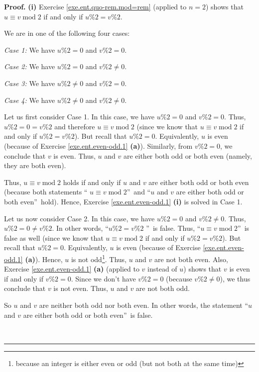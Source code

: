 \documentclass[numbers=enddot,12pt,final,onecolumn,notitlepage]{scrartcl}%
\numberwithin{exer}{subsection}
\theoremstyle{definition}
\newenvironment{fineprint}{\begin{small}}{\end{small}}
\newenvironment{proof}[1][Proof]{\noindent\textbf{#1.} }{\ \rule{0.5em}{0.5em}}
\begin{document}
\begin{fineprint}
\begin{proof}
\textbf{(i)} Exercise \ref{exe.ent.quo-rem.mod=rem} (applied to $n=2$) shows
that $u\equiv v\operatorname{mod}2$ if and only if $u\%2=v\%2$.

We are in one of the following four cases:

\textit{Case 1:} We have $u\%2=0$ and $v\%2=0$.

\textit{Case 2:} We have $u\%2=0$ and $v\%2\neq0$.

\textit{Case 3:} We have $u\%2\neq0$ and $v\%2=0$.

\textit{Case 4:} We have $u\%2\neq0$ and $v\%2\neq0$.

Let us first consider Case 1. In this case, we have $u\%2=0$ and $v\%2=0$.
Thus, $u\%2=0=v\%2$ and therefore $u\equiv v\operatorname{mod}2$ (since we
know that $u\equiv v\operatorname{mod}2$ if and only if $u\%2=v\%2$). But
recall that $u\%2=0$. Equivalently, $u$ is even (because of Exercise
\ref{exe.ent.even-odd.1} \textbf{(a)}). Similarly, from $v\%2=0$, we conclude
that $v$ is even. Thus, $u$ and $v$ are either both odd or both even (namely,
they are both even).

Thus, $u\equiv v\operatorname{mod}2$ holds if and only if $u$ and $v$ are
either both odd or both even (because both statements \textquotedblleft%
$u\equiv v\operatorname{mod}2$\textquotedblright\ and \textquotedblleft$u$ and
$v$ are either both odd or both even\textquotedblright\ hold). Hence, Exercise
\ref{exe.ent.even-odd.1} \textbf{(i)} is solved in Case 1.

Let us now consider Case 2. In this case, we have $u\%2=0$ and $v\%2\neq0$.
Thus, $u\%2=0\neq v\%2$. In other words, \textquotedblleft$u\%2=v\%2$%
\textquotedblright\ is false. Thus, \textquotedblleft$u\equiv
v\operatorname{mod}2$\textquotedblright\ is false as well (since we know that
$u\equiv v\operatorname{mod}2$ if and only if $u\%2=v\%2$). But recall that
$u\%2=0$. Equivalently, $u$ is even (because of Exercise
\ref{exe.ent.even-odd.1} \textbf{(a)}). Hence, $u$ is not odd\footnote{because
an integer is either even or odd (but not both at the same time)}. Thus, $u$
and $v$ are not both even. Also, Exercise \ref{exe.ent.even-odd.1}
\textbf{(a)} (applied to $v$ instead of $u$) shows that $v$ is even if and
only if $v\%2=0$. Since we don't have $v\%2=0$ (because $v\%2\neq0$), we thus
conclude that $v$ is not even. Thus, $u$ and $v$ are not both odd.

So $u$ and $v$ are neither both odd nor both even. In other words, the
statement \textquotedblleft$u$ and $v$ are either both odd or both
even\textquotedblright\ is false.


\end{proof}
\end{fineprint}
\end{document}
